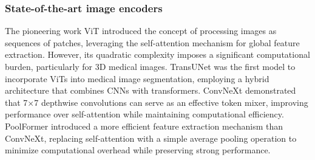 

\subsubsection*{State-of-the-art image encoders}
The pioneering work ViT \cite{dosovitskiy2020image} introduced the concept of processing images as sequences of patches, leveraging the self-attention mechanism for global feature extraction. However, its quadratic complexity imposes a significant computational burden, particularly for 3D medical images. TransUNet \cite{chen2021transunet} was the first model to incorporate ViTs into medical image segmentation, employing a hybrid architecture that combines CNNs with transformers. ConvNeXt \cite{liu2022convnet} demonstrated that 7×7 depthwise convolutions can serve as an effective token mixer, improving performance over self-attention while maintaining computational efficiency. PoolFormer \cite{yu2022metaformer} introduced a more efficient feature extraction mechanism than ConvNeXt, replacing self-attention with a simple average pooling operation to minimize computational overhead while preserving strong performance.


